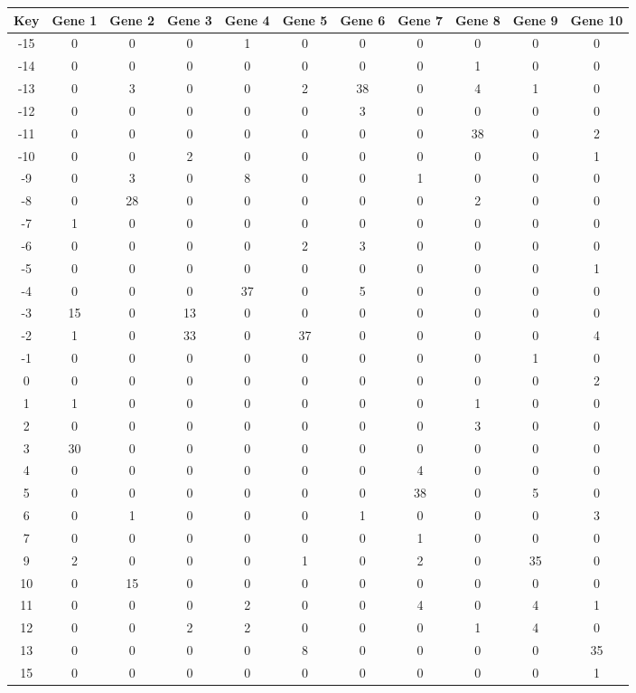 \begin{tabular}{|c|c|c|c|c|c|c|c|c|c|c|}
\hline
Key & Gene 1 & Gene 2 & Gene 3 & Gene 4 & Gene 5 & Gene 6 & Gene 7 & Gene 8 & Gene 9 & Gene 10 \\
\hline
-15 & 0 & 0 & 0 & 1 & 0 & 0 & 0 & 0 & 0 & 0 \\
-14 & 0 & 0 & 0 & 0 & 0 & 0 & 0 & 1 & 0 & 0 \\
-13 & 0 & 3 & 0 & 0 & 2 & 38 & 0 & 4 & 1 & 0 \\
-12 & 0 & 0 & 0 & 0 & 0 & 3 & 0 & 0 & 0 & 0 \\
-11 & 0 & 0 & 0 & 0 & 0 & 0 & 0 & 38 & 0 & 2 \\
-10 & 0 & 0 & 2 & 0 & 0 & 0 & 0 & 0 & 0 & 1 \\
-9 & 0 & 3 & 0 & 8 & 0 & 0 & 1 & 0 & 0 & 0 \\
-8 & 0 & 28 & 0 & 0 & 0 & 0 & 0 & 2 & 0 & 0 \\
-7 & 1 & 0 & 0 & 0 & 0 & 0 & 0 & 0 & 0 & 0 \\
-6 & 0 & 0 & 0 & 0 & 2 & 3 & 0 & 0 & 0 & 0 \\
-5 & 0 & 0 & 0 & 0 & 0 & 0 & 0 & 0 & 0 & 1 \\
-4 & 0 & 0 & 0 & 37 & 0 & 5 & 0 & 0 & 0 & 0 \\
-3 & 15 & 0 & 13 & 0 & 0 & 0 & 0 & 0 & 0 & 0 \\
-2 & 1 & 0 & 33 & 0 & 37 & 0 & 0 & 0 & 0 & 4 \\
-1 & 0 & 0 & 0 & 0 & 0 & 0 & 0 & 0 & 1 & 0 \\
0 & 0 & 0 & 0 & 0 & 0 & 0 & 0 & 0 & 0 & 2 \\
1 & 1 & 0 & 0 & 0 & 0 & 0 & 0 & 1 & 0 & 0 \\
2 & 0 & 0 & 0 & 0 & 0 & 0 & 0 & 3 & 0 & 0 \\
3 & 30 & 0 & 0 & 0 & 0 & 0 & 0 & 0 & 0 & 0 \\
4 & 0 & 0 & 0 & 0 & 0 & 0 & 4 & 0 & 0 & 0 \\
5 & 0 & 0 & 0 & 0 & 0 & 0 & 38 & 0 & 5 & 0 \\
6 & 0 & 1 & 0 & 0 & 0 & 1 & 0 & 0 & 0 & 3 \\
7 & 0 & 0 & 0 & 0 & 0 & 0 & 1 & 0 & 0 & 0 \\
9 & 2 & 0 & 0 & 0 & 1 & 0 & 2 & 0 & 35 & 0 \\
10 & 0 & 15 & 0 & 0 & 0 & 0 & 0 & 0 & 0 & 0 \\
11 & 0 & 0 & 0 & 2 & 0 & 0 & 4 & 0 & 4 & 1 \\
12 & 0 & 0 & 2 & 2 & 0 & 0 & 0 & 1 & 4 & 0 \\
13 & 0 & 0 & 0 & 0 & 8 & 0 & 0 & 0 & 0 & 35 \\
15 & 0 & 0 & 0 & 0 & 0 & 0 & 0 & 0 & 0 & 1 \\
\hline
\end{tabular}